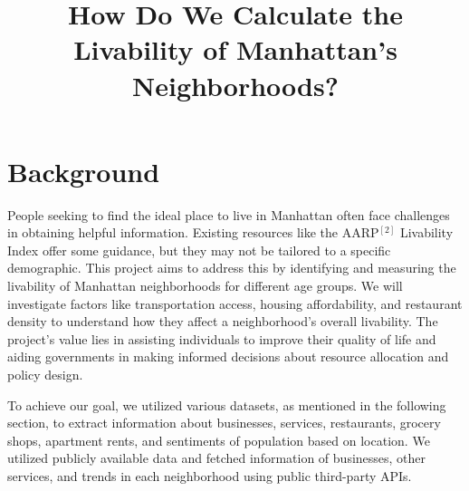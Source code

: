 \documentclass{article}
\title{How Do We Calculate the Livability of Manhattan's Neighborhoods?}
\begin{document}
\maketitle
\section{Background}
People seeking to find the ideal place to live in Manhattan often face challenges in obtaining helpful information. Existing resources like the AARP$^{[2]}$ Livability Index offer some guidance, but they may not be tailored to a specific demographic. This project aims to address this by identifying and measuring the livability of Manhattan neighborhoods for different age groups. We will investigate factors like transportation access, housing affordability, and restaurant density to understand how they affect a neighborhood's overall livability. The project's value lies in assisting individuals to improve their quality of life and aiding governments in making informed decisions about resource allocation and policy design.

To achieve our goal, we utilized various datasets, as mentioned in the following section, to extract information about businesses, services, restaurants, grocery shops, apartment rents, and sentiments of population based on location. We utilized publicly available data and fetched information of businesses, other services, and trends in each neighborhood using public third-party APIs. 
\end{document}

